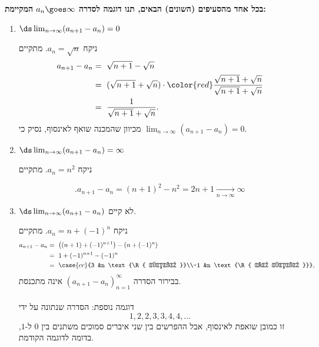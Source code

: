 \textbf{בכל אחד מהסעיפים (השונים) הבאים,
תנו דוגמה לסדרה
$a_n\goes\infty$
המקיימת:}
\begin{enumerate}
\item $\ds\lim_{n \to \infty} (a_{n+1} - a_n) = 0$
\begin{solbox}
ניקח
$a_n=\sqrt{n}$.
מתקיים
\begin{align*}
    a_{n+1}-a_n&=\ \sqrt{n+1}-\sqrt{n}\\
    &=\ (\sqrt{n+1}+\sqrt{n})\cdot{\color{red}\frac{\sqrt{n+1}+\sqrt{n}}{\sqrt{n+1}+\sqrt{n}}}\\
    &=\ \frac{1}{\sqrt{n+1}+\sqrt{n}}.
\end{align*}
מכיוון שהמכנה שואף לאינסוף,
נסיק כי
$\lim_{n\to\infty}(a_{n+1}-a_n)=0$.

\end{solbox}
\item $\ds\lim_{n \to \infty} (a_{n+1} - a_n) = \infty$
\begin{solbox}
ניקח
$a_n=n^2$.
מתקיים

    $$.a_{n+1}-a_n=(n+1)^2-n^2=2n+1\xrightarrow[n\to\infty]{}\infty$$

\end{solbox}
\item $\ds\lim_{n \to \infty} (a_{n+1} - a_n)$ לא קיים.
\begin{solbox}
 ניקח
$a_n=n+(-1)^n$.
מתקיים
\begin{align*}
    a_{n+1}-a_n&=\ \left((n+1)+(-1)^{n+1}\right)-\left(n+(-1)^n\right)\\
    &=\ 1+(-1)^{n+1}-(-1)^n\\
    &=\ \case{cc}{3 &n \text{\R{ זוגי }}\\-1 &n \text{\R{ אי זוגי }}},
    \end{align*}
בבירור הסדרה
$(a_{n+1}-a_{n})_{n=1}^\infty$
אינה מתכנסת.
\\\\

    דוגמה נוספת: הסדרה שנתונה על ידי
    $$1,2,2,3,3,4,4,\ldots$$
    זו כמובן שואפת לאינסוף, אבל ההפרשים בין שני איברים סמוכים משתנים בין
    $0$
    ל-$1$,
    בדומה לדוגמה הקודמת.
\end{solbox}
\eMs
\end{enumerate}
